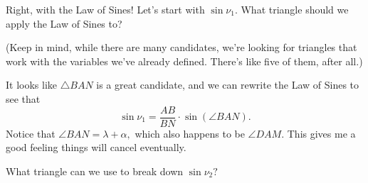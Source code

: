 Right, with the Law of Sines! Let's start with $\sin \nu_1.$ What triangle should we apply the Law of Sines to?

(Keep in mind, while there are many candidates, we're looking for triangles that work with the variables we've already defined. There's like five of them, after all.)







It looks like $\triangle BAN$ is a great candidate, and we can rewrite the Law of Sines to see that $$\sin \nu_1 = \frac{AB}{BN}\cdot \sin{(\angle BAN)}.$$ Notice that $\angle BAN = \lambda + \alpha,$ which also happens to be $\angle DAM$. This gives me a good feeling things will cancel eventually.

What triangle can we use to break down $\sin \nu_2?$










